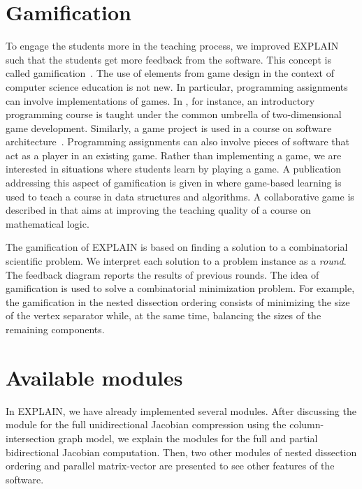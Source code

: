 \documentclass[12pt, twoside,a4paper,toc=bibliography]{scrbook}
\begin{document}
\section{Gamification}
\label{s.game}
To engage the students more in the teaching process, we improved EXPLAIN such that the students get
more feedback from the software.
This concept is called gamification~\cite{deterding2011:gug,deterding2011}.
The use of elements from game design in the context of
computer science education is not new. In particular, programming assignments can involve
implementations of games. In \cite{la2007:gfa}, for instance, an introductory programming course is
taught under the common umbrella of two-dimensional game development. Similarly, a game project is
used in a course on software architecture~\cite{Wang2011:EEU}. Programming assignments can also
involve pieces of software that act as a player in an existing game. Rather than implementing a game, we are
interested in situations where students learn by playing a game.
A publication addressing this aspect of gamification is given in
\cite{Hakulinen2011:usg} where game-based learning is used to teach a course in data structures and
algorithms. A collaborative game is described in \cite{shl:bsc} that aims at improving the teaching
quality of a course on mathematical logic.

The gamification of \mbox{EXPLAIN} is based on finding a solution to a combinatorial scientific problem.
We interpret each solution to a problem instance as a \textit{round}.
The feedback diagram reports the results of previous rounds.
The idea of gamification is used to solve a combinatorial
minimization problem. For example, the gamification in the nested dissection ordering
consists of minimizing the size of the vertex separator while, at the same
time, balancing the sizes of the remaining components.


\section{Available modules}
\label{s.av.modules}
In \mbox{EXPLAIN}, we have already implemented several modules.
After discussing the module for the full unidirectional Jacobian compression using the column-intersection graph model,
we explain the modules for the full and partial bidirectional Jacobian computation.
Then, two other modules of nested dissection ordering and parallel matrix-vector
are presented to see other features of the software.
\end{document}

